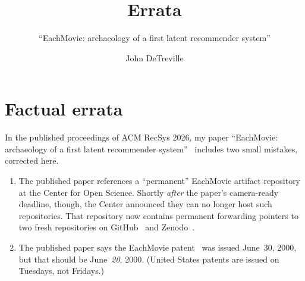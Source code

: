 \documentclass[nonacm,manuscript,screen,microtype={protrusion=true,expansion,kerning,spacing}]{acmart}
\begin{document}
\title{Errata}
\subtitle{``EachMovie: archaeology of a first latent recommender system''}
\author{John DeTreville}

\maketitle{}

\section*{Factual errata}

In the published proceedings of ACM RecSys 2026, my paper ``EachMovie: archaeology of a first latent recommender system''~\cite{DeTreville2026EachMovie_paper} includes two small mistakes, corrected here.
\begin{enumerate}

\item The published paper references a ``permanent'' EachMovie artifact repository at the Center for Open Science. Shortly \emph{after} the paper's camera-ready deadline, though, the Center announced they can no longer host such repositories. That repository now contains permanent forwarding pointers to two fresh repositories on GitHub~\cite{EachMovieGitHub} and Zenodo~\cite{EachMovieZenodo}.

  \item The published paper says the EachMovie patent~\cite{DeTrevillePatent2000} was issued June~30, 2000, but that should be June~\emph{20}, 2000. (United States patents are issued on Tuesdays, not Fridays.)
\end{enumerate}



\end{document}
